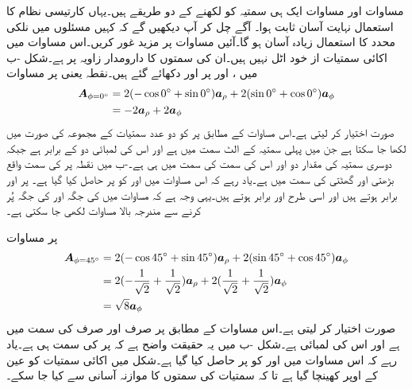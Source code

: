 مساوات  اور مساوات  ایک ہی سمتیہ کو لکھنے کے دو طریقے ہیں۔یہاں کارتیسی نظام کا استعمال نہایت آسان ثابت ہوا۔ آگے چل کر آپ دیکھیں گے کہ کہیں مسئلوں میں نلکی محدد کا استعمال زیادہ آسان ہو گا۔آئیں مساوات  پر مزید غور کریں۔اس مساوات میں اکائی سمتیات از خود اٹل نہیں ہیں۔ان کی سمتوں کا دارومدار زاویہ  پر ہے۔شکل  -ب میں ،  اور  پر  اور  دکھائے گئے ہیں۔نقطہ  یعنی  پر مساوات  
\begin{align*}
{\ensuremath{{\boldsymbol{A}}}}_{ \phi=0^\circ}&=2(- \cos 0^\circ + \sin 0^\circ ) {\boldsymbol{a}}_{\rho} +2( \sin 0^\circ  + \cos 0^\circ ){\boldsymbol{a}}_{\phi}\\
&=-2{\boldsymbol{a}}_{\rho}+2{\boldsymbol{a}}_{\phi} 
\end{align*} 
صورت اختیار کر لیتی ہے۔اس مساوات کے مطابق  پر  کو دو عدد سمتیات کے مجموعہ کی صورت میں لکھا جا سکتا ہے جن میں پہلی سمتیہ  کے الٹ سمت میں ہے اور اس کی لمبائی دو کے برابر ہے جبکہ دوسری سمتیہ کی مقدار دو اور اس کی سمت  کی سمت میں ہی ہے۔-ب میں نقطہ  پر  کی سمت واقع بڑھتی  اور گھٹتی  کی سمت میں ہے۔یاد رہے کہ اس مساوات میں  اور  کو  پر حاصل کیا گیا ہے۔ پر  اور  برابر ہوتے ہیں اور اسی طرح  اور  برابر ہوتے ہیں۔یہی وجہ ہے کہ مساوات  میں  کی جگہ  اور  کی جگہ  پُر کرنے سے مندرجہ بالا مساوات لکھی جا سکتی ہے۔

 پر مساوات 
\begin{align*}
{\ensuremath{{\boldsymbol{A}}}}_{\phi=45^\circ}&=2(- \cos 45^\circ + \sin 45^\circ ) {\boldsymbol{a}}_{\rho} +2( \sin 45^\circ  + \cos 45^\circ ){\boldsymbol{a}}_{\phi}\\
&=2(- \frac{1}{\sqrt{2}} +\frac{1}{\sqrt{2}} ) {\boldsymbol{a}}_{\rho} +2( \frac{1}{\sqrt{2}}  + \frac{1}{\sqrt{2}} ){\boldsymbol{a}}_{\phi}\\
&=\sqrt{8} {\boldsymbol{a}}_{\phi}
\end{align*} 
صورت اختیار کر لیتی ہے۔اس مساوات کے مطابق  پر  صرف اور صرف  کی سمت میں ہے اور اس کی لمبائی  ہے۔شکل -ب میں یہ حقیقت واضح ہے کہ   پر  کی سمت  ہی ہے۔یاد رہے کہ اس مساوات میں  اور  کو  پر حاصل کیا گیا ہے۔شکل میں اکائی سمتیات کو عین  کے اوپر کھینچا گیا ہے تا کہ سمتیات کی سمتوں کا موازنہ آسانی سے کیا جا سکے۔

